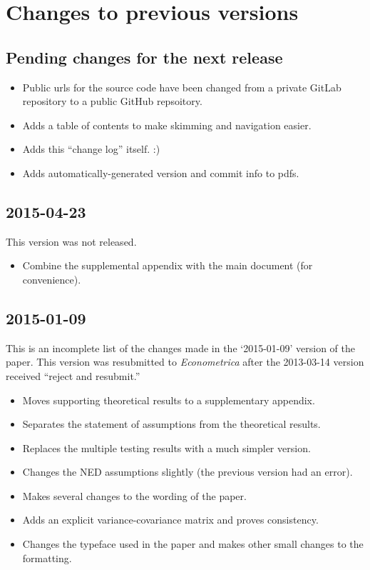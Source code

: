 \section{Changes to previous versions}
\subsection{Pending changes for the next release}

\begin{itemize}
\item Public urls for the source code have been changed from a private
GitLab repository to a public GitHub repsoitory.
\item Adds a table of contents to make skimming and navigation easier.
\item Adds this ``change log'' itself. :)
\item Adds automatically-generated version and commit info to pdfs.
\end{itemize}

\subsection{2015-04-23}
This version was not released.

\begin{itemize}
\item Combine the supplemental appendix with the main document (for
convenience).
\end{itemize}

\subsection{2015-01-09}
This is an incomplete list of the changes made in the `2015-01-09'
version of the paper. This version was resubmitted to
\textit{Econometrica} after the 2013-03-14 version received ``reject
and resubmit.''

\begin{itemize}
\item Moves supporting theoretical results to a supplementary
appendix.
\item Separates the statement of assumptions from the theoretical
results.
\item Replaces the multiple testing results with a much simpler
version.
\item Changes the NED assumptions slightly (the previous version had
an error).
\item Makes several changes to the wording of the paper.
\item Adds an explicit variance-covariance matrix and proves
consistency.
\item Changes the typeface used in the paper and makes other small
changes to the formatting.
\end{itemize}

